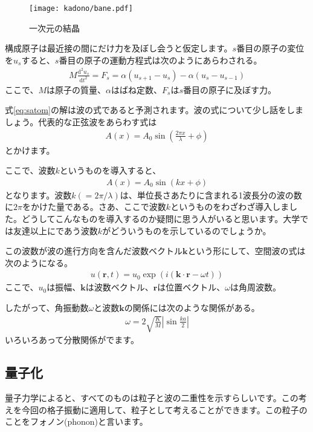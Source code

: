 \documentclass[10pt,b5paper,papersize,dvipdfmx]{jsbook}
\begin{document}
\begin{figure}[htbp]
  \centering
  \texttt{[image: kadono/bane.pdf]}  %
  \caption{一次元の結晶}
  \label{fig:bane}
\end{figure}
構成原子は最近接の間にだけ力を及ぼし会うと仮定します。$s$番目の原子の変位を$u_s$すると、$s$番目の原子の運動方程式は次のようにあらわされる。
\begin{align}
  M\frac{\mathrm{d}^2u_s}{\mathrm{d}t^2} = F_s = \alpha (u_{s+1} - u_s) - \alpha (u_s - u_{s-1})
  \label{eq:satom}
\end{align}
ここで、$M$は原子の質量、$\alpha$はばね定数、$F_s$は$s$番目の原子に及ぼす力。\par
式\ref{eq:satom}の解は波の式であると予測されます。波の式について少し話をしましょう。代表的な正弦波をあらわす式は
\begin{align}
  A(x) = A_0 \sin \left(\frac{2\pi x}{\lambda} + \phi \right)
\end{align}
とかけます。\par
ここで、波数$k$というものを導入すると、
\begin{align}
  A(x) = A_0 \sin (kx + \phi)
\end{align}
となります。波数$k (= 2\pi/\lambda)$は、単位長さあたりに含まれる1波長分の波の数に$2\pi$をかけた量である。さあ、ここで波数$k$というものをわざわざ導入しました。どうしてこんなものを導入するのか疑問に思う人がいると思います。大学では友達以上にであう波数$k$がどういうものを示しているのでしょうか。\par
この波数が波の進行方向を含んだ波数ベクトル$\bm{k}$という形にして、空間波の式は次のようになる。
\begin{align}
  u(\bm{r},t) = u_0 \exp(i(\bm{k} \cdot \bm{r} - \omega t))
\end{align}
ここで、$u_0$は振幅、$\bm{k}$は波数ベクトル、$\bm{r}$は位置ベクトル、$\omega$は角周波数。\par

したがって、角振動数$\omega$と波数$\bm{k}$の関係には次のような関係がある。
\begin{align}
  \omega = 2 \sqrt{\frac{K}{M}} \left| \sin \frac{ka}{2}\right|
\end{align}
いろいろあって分散関係がでます。

\subsection{量子化}
量子力学によると、すべてのものは粒子と波の二重性を示すらしいです。この考えを今回の格子振動に適用して、粒子として考えることができます。この粒子のことをフォノン(phonon)と言います。
\end{document}
